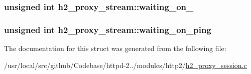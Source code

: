 \subsubsection[{\texorpdfstring{waiting\+\_\+on\+\_\+100}{waiting_on_100}}]{\setlength{\rightskip}{0pt plus 5cm}unsigned {\bf int} h2\+\_\+proxy\+\_\+stream\+::waiting\+\_\+on\+\_}\hypertarget{structh2__proxy__stream_acfc9ba07bf510195bdb0dc4b4f6faebd}{}\label{structh2__proxy__stream_acfc9ba07bf510195bdb0dc4b4f6faebd}
\subsubsection[{\texorpdfstring{waiting\+\_\+on\+\_\+ping}{waiting_on_ping}}]{\setlength{\rightskip}{0pt plus 5cm}unsigned {\bf int} h2\+\_\+proxy\+\_\+stream\+::waiting\+\_\+on\+\_\+ping}\hypertarget{structh2__proxy__stream_ac969a6ac3e74dcae2f4395518dedb19f}{}\label{structh2__proxy__stream_ac969a6ac3e74dcae2f4395518dedb19f}


The documentation for this struct was generated from the following file\+:\begin{DoxyCompactItemize}
\item 
/usr/local/src/github/\+Codebase/httpd-\/2../modules/http2/\hyperlink{h2__proxy__session_8c}{h2\+\_\+proxy\+\_\+session.\+c}\end{DoxyCompactItemize}
